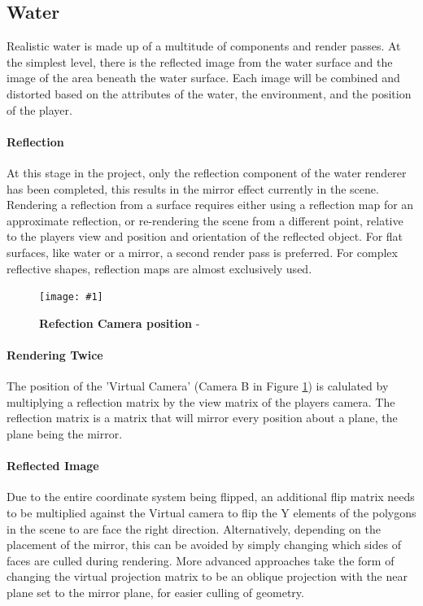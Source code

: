 \documentclass[conference]{acmsiggraph}
\newcommand{\figuremacroW}[4]{
	\begin{figure}[h] %
		\centering
		\texttt{[image: \#1]}
		\caption[#2]{\textbf{#2} - #3}
		\label{fig:#1}
	\end{figure}
}
\begin{document}
\subsection{Water}

Realistic water is made up of a multitude of components and render passes. At the simplest level, there is the reflected image from the water surface and the image of the area beneath the water surface. Each image will be combined and distorted based on the attributes of the water, the environment, and the position of the player.

\paragraph{Reflection}
At this stage in the project, only the reflection component of the water renderer has been completed, this results in the mirror effect currently in the scene. Rendering a reflection from a surface requires either using a reflection map for an approximate reflection, or re-rendering the scene from a different point, relative to the players view and position and orientation of the reflected object.
For flat surfaces, like water or a mirror, a second render pass is preferred. For complex reflective shapes, reflection maps are almost exclusively used.


\figuremacroW
{reflections}
{Refection Camera position}
{\protect\cite{Riemer}}
{1.0}

\paragraph{Rendering Twice}
The position of the 'Virtual Camera' (Camera B in Figure \ref{fig:reflections}) is calulated by multiplying a reflection matrix by the view matrix of the players camera. The reflection matrix is a matrix that will mirror every position about a plane, the plane being the mirror.

\paragraph{Reflected Image}
Due to the entire coordinate system being flipped, an additional flip matrix needs to be multiplied against the Virtual camera to flip the Y elements of the polygons in the scene to are face the right direction. Alternatively, depending on the placement of the mirror, this can be avoided by simply changing which sides of faces are culled during rendering. More advanced approaches take the form of changing the virtual projection matrix to be an oblique projection with the near plane set to the mirror plane, for easier culling of geometry.
\end{document}
